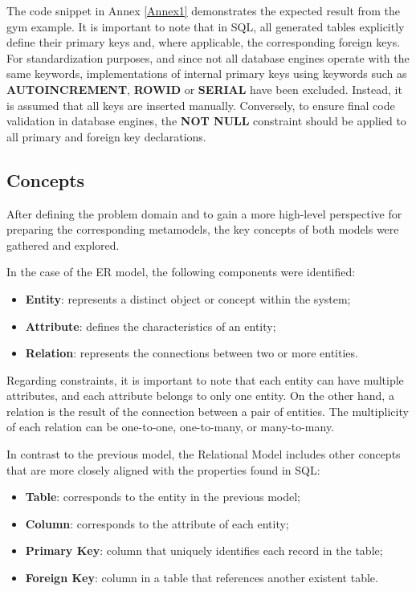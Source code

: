 \documentclass[10pt]{article}
\begin{document}
The code snippet in Annex \ref{Annex1} demonstrates the expected result from the gym example. It is important to note that in SQL, all generated tables explicitly define their primary keys and, where applicable, the corresponding foreign keys. For standardization purposes, and since not all database engines operate with the same keywords, implementations of internal primary keys using keywords such as \textbf{AUTOINCREMENT}, \textbf{ROWID} or \textbf{SERIAL} have been excluded. Instead, it is assumed that all keys are inserted manually. Conversely, to ensure final code validation in database engines, the \textbf{NOT NULL} constraint should be applied to all primary and foreign key declarations.

\subsection{Concepts}

After defining the problem domain and to gain a more high-level perspective for preparing the corresponding metamodels, the key concepts of both models were gathered and explored.

In the case of the ER model, the following components were identified:

\begin{itemize}

    \item \textbf{Entity}: represents a distinct object or concept within the system;
    
    \item \textbf{Attribute}: defines the characteristics of an entity;
    
    \item \textbf{Relation}: represents the connections between two or more entities.
    
\end{itemize}

Regarding constraints, it is important to note that each entity can have multiple attributes, and each attribute belongs to only one entity. On the other hand, a relation is the result of the connection between a pair of entities. The multiplicity of each relation can be one-to-one, one-to-many, or many-to-many.

In contrast to the previous model, the Relational Model includes other concepts that are more closely aligned with the properties found in SQL:

\begin{itemize}

    \item \textbf{Table}: corresponds to the entity in the previous model;
    
    \item \textbf{Column}: corresponds to the attribute of each entity;
    
    \item \textbf{Primary Key}: column that uniquely identifies each record in the table;
    
    \item \textbf{Foreign Key}: column in a table that references another existent table.
    
\end{itemize}
\end{document}
